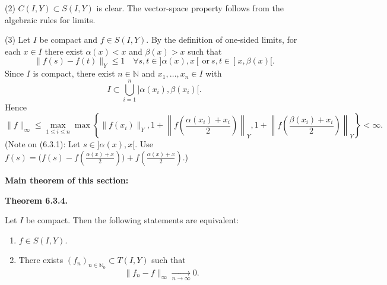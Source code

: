 \documentclass[12pt]{article}
\newenvironment{satz}[1]{%
  \par\vspace{6pt}\noindent\textbf{Theorem #1.}\itshape\space
}{%
  \par\vspace{6pt}
}
\begin{document}
  \noindent(2) $C(I,Y)\subset S(I,Y)$ is clear. The vector-space property follows from the algebraic rules for limits.

  \noindent(3) Let $I$ be compact and $f\in S(I,Y)$. By the definition of one-sided limits, for each $x\in I$ there exist
  \(\alpha(x)<x\) and \(\beta(x)>x\) such that
  \[
  \|f(s)-f(t)\|_Y\le 1
  \quad
  \forall s,t\in] \alpha(x),x[
  \ \text{or}\ s,t\in]x,\beta(x)[.
  \]
  Since $I$ is compact, there exist $n\in\mathbb N$ and $x_1,\ldots,x_n\in I$ with
  \[
  I\subset\bigcup_{i=1}^n ]\alpha(x_i),\beta(x_i)[.
  \]
  Hence
  \[
  \|f\|_\infty
  \le
  \max_{1\le i\le n}
  \max\!\left\{
  \|f(x_i)\|_Y,
  1+\left\|f\!\left(\frac{\alpha(x_i)+x_i}{2}\right)\right\|_Y,
  1+\left\|f\!\left(\frac{\beta(x_i)+x_i}{2}\right)\right\|_Y
  \right\}
  <\infty.
  \tag{6.3.1}
  \]
  (Note on (6.3.1): Let $s\in] \alpha(x),x[$. Use
  \(f(s)=\bigl(f(s)-f(\tfrac{\alpha(x)+x}{2})\bigr)+f(\tfrac{\alpha(x)+x}{2})\).)

  \par\vspace{6pt}\noindent\textbf{Main theorem of this section:}

  \begin{satz}{6.3.4}
  Let $I$ be compact. Then the following statements are equivalent:
  \begin{enumerate}
    \item $f\in S(I,Y)$.
    \item There exists $(f_n)_{n\in\mathbb N_0}\subset T(I,Y)$ such that
    \[
    \|f_n-f\|_\infty\xrightarrow[n\to\infty]{}0.
    \]
  \end{enumerate}
  \end{satz}
\end{document}
